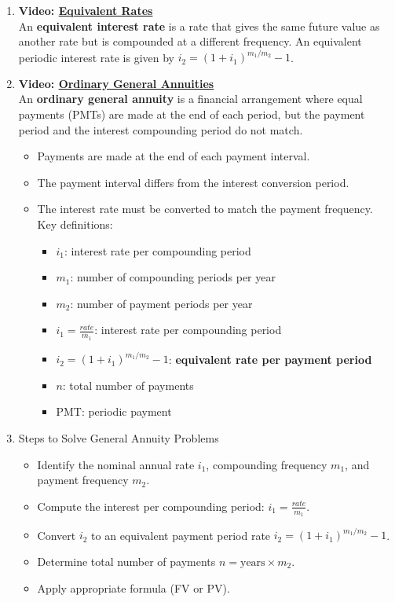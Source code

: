 \documentclass[
]{book}
\providecommand{\tightlist}{%
  \setlength{\itemsep}{0pt}\setlength{\parskip}{0pt}}
\begin{document}
\begin{enumerate}
\def\labelenumi{\arabic{enumi}.}
\tightlist
\item
  \textbf{Video: \href{https://youtu.be/-m7XgzLWk2g}{Equivalent Rates}}\\
  An \textbf{equivalent interest rate} is a rate that gives the same future value as another rate but is compounded at a different frequency. An equivalent periodic interest rate is given by \(i_2 = \left(1 + i_1\right)^{m_1/m_2} - 1\).
\item
  \textbf{Video: \href{https://youtu.be/8KY9aTEcZog}{Ordinary General Annuities}}\\
  An \textbf{ordinary general annuity} is a financial arrangement where equal payments (PMTs) are made at the end of each period, but the payment period and the interest compounding period do not match.

  \begin{itemize}
  \tightlist
  \item
    Payments are made at the end of each payment interval.
  \item
    The payment interval differs from the interest conversion period.
  \item
    The interest rate must be converted to match the payment frequency.\\
    Key definitions:

    \begin{itemize}
    \tightlist
    \item
      \(i_1\): interest rate per compounding period
    \item
      \(m_1\): number of compounding periods per year
    \item
      \(m_2\): number of payment periods per year
    \item
      \(i_1 = \frac{rate}{m_1}\): interest rate per compounding period
    \item
      \(i_2 = \left(1 + i_1\right)^{m_1/m_2} - 1\): \textbf{equivalent rate per payment period}
    \item
      \(n\): total number of payments
    \item
      \(\text{PMT}\): periodic payment
    \end{itemize}
  \end{itemize}
\item
  Steps to Solve General Annuity Problems

  \begin{itemize}
  \tightlist
  \item
    Identify the nominal annual rate \(i_1\), compounding frequency \(m_1\), and payment frequency \(m_2\).
  \item
    Compute the interest per compounding period: \(i_1 = \frac{rate}{m_1}\).
  \item
    Convert \(i_2\) to an equivalent payment period rate \(i_2 = \left(1 + i_1 \right)^{m_1/m_2} - 1\).
  \item
    Determine total number of payments \(n = \text{years} \times m_2\).
  \item
    Apply appropriate formula (FV or PV).
  \end{itemize}
\end{enumerate}
\end{document}
